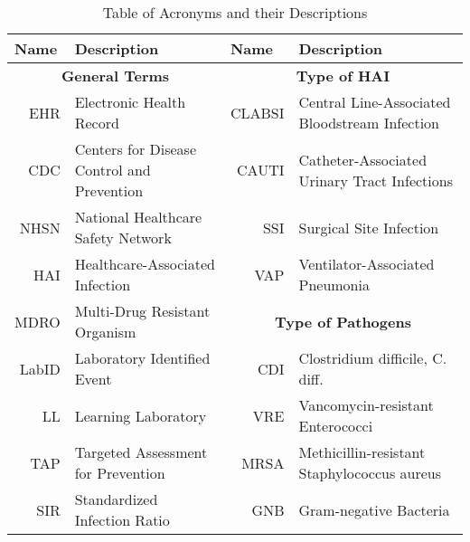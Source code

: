 \begin{table}[]
	\caption{Table of Acronyms and their Descriptions}
	\label{tab1}
	{\footnotesize
	\begin{tabular}{|l|l|r|l|}
		\hline
		\textbf{Name}              & \textbf{Description}                       & \multicolumn{1}{l|}{\textbf{Name}} & \textbf{Description}                               \\ \hline
		\multicolumn{2}{|c|}{\textbf{General Terms}}                            & \multicolumn{2}{c|}{\textbf{Type of HAI}}                                               \\ \hline
		\multicolumn{1}{|r|}{EHR}  & Electronic Health Record                   & CLABSI                             & Central Line-Associated Bloodstream Infection      \\ \hline
		\multicolumn{1}{|r|}{CDC}  & Centers for Disease Control and Prevention & CAUTI                              & Catheter-Associated Urinary Tract Infections       \\ \hline
		\multicolumn{1}{|r|}{NHSN} & National Healthcare Safety Network         & SSI                                & Surgical Site Infection                            \\ \hline
		\multicolumn{1}{|r|}{HAI}  & Healthcare-Associated Infection             & VAP                                & Ventilator-Associated Pneumonia                    \\ \hline
		\multicolumn{1}{|r|}{MDRO} & Multi-Drug Resistant Organism              & \multicolumn{2}{c|}{\textbf{Type of Pathogens}}                                         \\ \hline
		\multicolumn{1}{|r|}{LabID}& Laboratory Identified Event        		& CDI                                & Clostridium difficile, C. diff.                    \\ \hline
		\multicolumn{1}{|r|}{LL}   & Learning Laboratory                        & VRE                                & Vancomycin-resistant Enterococci                   \\ \hline
		\multicolumn{1}{|r|}{TAP}  & Targeted Assessment for Prevention         & MRSA                               & Methicillin-resistant Staphylococcus aureus 	   \\ \hline
		\multicolumn{1}{|r|}{SIR}  & Standardized Infection Ratio               & GNB                                & Gram-negative Bacteria                             \\ \hline
	\end{tabular}
	}
\end{table}




